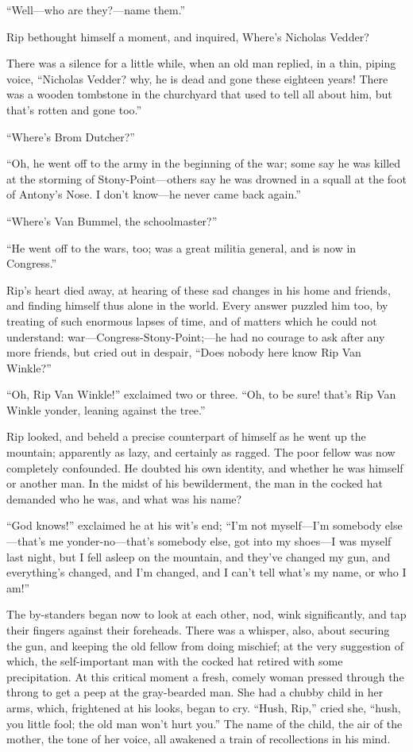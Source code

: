 “Well—who are they?—name them.”

Rip bethought himself a moment, and inquired, Where’s Nicholas Vedder?

There was a silence for a little while, when an old man replied, in a thin, piping voice, “Nicholas Vedder? why, he is dead and gone these eighteen years! There was a wooden tombstone in the churchyard that used to tell all about him, but that’s rotten and gone too.”

“Where’s Brom Dutcher?”

“Oh, he went off to the army in the beginning of the war; some say he was killed at the storming of Stony-Point—others say he was drowned in a squall at the foot of Antony’s Nose. I don’t know—he never came back again.”

“Where’s Van Bummel, the schoolmaster?”

“He went off to the wars, too; was a great militia general, and is now in Congress.”

Rip’s heart died away, at hearing of these sad changes in his home and friends, and finding himself thus alone in the world. Every answer puzzled him too, by treating of such enormous lapses of time, and of matters which he could not understand: war—Congress-Stony-Point;—he had no courage to ask after any more friends, but cried out in despair, “Does nobody here know Rip Van Winkle?”

“Oh, Rip Van Winkle!” exclaimed two or three. “Oh, to be sure! that’s Rip Van Winkle yonder, leaning against the tree.”

Rip looked, and beheld a precise counterpart of himself as he went up the mountain; apparently as lazy, and certainly as ragged. The poor fellow was now completely confounded. He doubted his own identity, and whether he was himself or another man. In the midst of his bewilderment, the man in the cocked hat demanded who he was, and what was his name?

“God knows!” exclaimed he at his wit’s end; “I’m not myself—I’m somebody else—that’s me yonder-no—that’s somebody else, got into my shoes—I was myself last night, but I fell asleep on the mountain, and they’ve changed my gun, and everything’s changed, and I’m changed, and I can’t tell what’s my name, or who I am!”

The by-standers began now to look at each other, nod, wink significantly, and tap their fingers against their foreheads. There was a whisper, also, about securing the gun, and keeping the old fellow from doing mischief; at the very suggestion of which, the self-important man with the cocked hat retired with some precipitation. At this critical moment a fresh, comely woman pressed through the throng to get a peep at the gray-bearded man. She had a chubby child in her arms, which, frightened at his looks, began to cry. “Hush, Rip,” cried she, “hush, you little fool; the old man won’t hurt you.” The name of the child, the air of the mother, the tone of her voice, all awakened a train of recollections in his mind.

